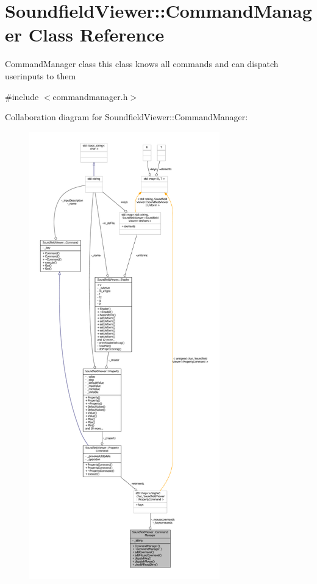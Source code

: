\section{Soundfield\-Viewer\-:\-:Command\-Manager Class Reference}
\label{classSoundfieldViewer_1_1CommandManager}


Command\-Manager class this class knows all commands and can dispatch userinputs to them  




{\ttfamily \#include $<$commandmanager.\-h$>$}



Collaboration diagram for Soundfield\-Viewer\-:\-:Command\-Manager\-:\nopagebreak
\begin{figure}[H]
\begin{center}
\leavevmode
\includegraphics[height=550pt]{df/dae/classSoundfieldViewer_1_1CommandManager__coll__graph}
\end{center}
\end{figure}
